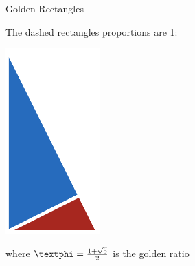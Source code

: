 \documentclass[14pt]{beamer}
\begin{document}

    \begin{frame}{Golden Rectangles}
        \begin{center}
            The dashed rectangles proportions are 1:\textphi
        \end{center}
        \hspace{3.85em} \includegraphics[scale=1.0]{figures/figure020c.pdf} \\
        \begin{center}
            where $\text{\textphi} =\tfrac{1+\sqrt{5}}{2}$ is the golden ratio
        \end{center}
    \end{frame}

\end{document}
